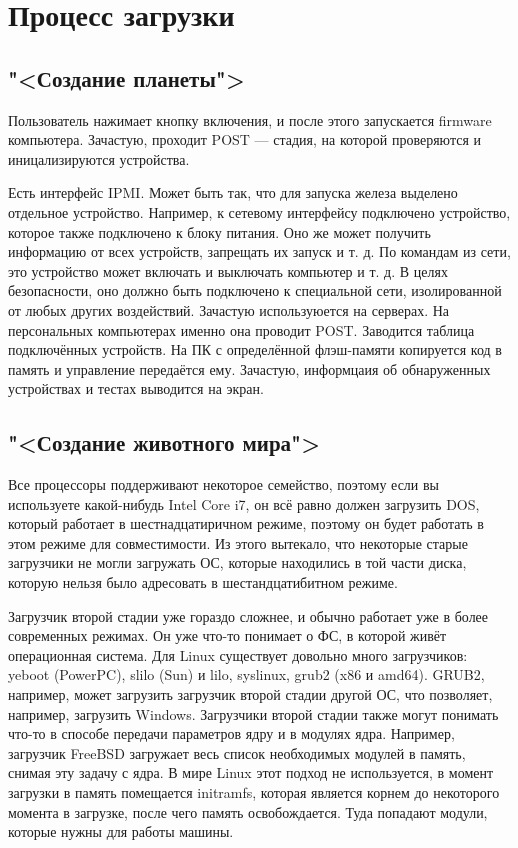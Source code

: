 \documentclass[main]{subfiles}
\begin{document}
\chapter{Процесс загрузки}

\section{"<Создание планеты">}
Пользователь нажимает кнопку включения, и после этого запускается
firmware компьютера. Зачастую, проходит POST --- стадия, на которой
проверяются и иницализируются устройства.

Есть интерфейс IPMI.
Может быть так, что для запуска железа выделено отдельное устройство.
Например, к сетевому интерфейсу подключено устройство, которое также
подключено к блоку питания. Оно же может получить информацию от всех
устройств, запрещать их запуск и т. д. По командам из сети, это устройство
может включать и выключать компьютер и т. д. В целях безопасности, оно должно
быть подключено к специальной сети, изолированной от любых других воздействий.
Зачастую используюется на серверах.
На персональных компьютерах именно она проводит POST. Заводится таблица
подключённых устройств. На ПК с определённой флэш-памяти копируется код в
память и управление передаётся ему. Зачастую, информцаия об обнаруженных
устройствах и тестах выводится на экран.

\section{"<Создание животного мира">}
Все процессоры поддерживают некоторое семейство, поэтому если вы используете
какой-нибудь Intel Core i7, он всё равно должен загрузить DOS, который работает
в шестнадцатиричном режиме, поэтому он будет работать в этом режиме для совместимости.
Из этого вытекало, что некоторые старые загрузчики не могли загружать ОС,
которые находились в той части диска, которую нельзя было адресовать в
шестандцатибитном режиме.

Загрузчик второй стадии уже гораздо сложнее, и обычно работает уже в более
современных режимах. Он уже что-то понимает о ФС, в которой живёт операционная
система. Для Linux существует довольно много загрузчиков: yeboot (PowerPC),
slilo (Sun) и lilo, syslinux, grub2 (x86 и amd64).
GRUB2, например, может загрузить загрузчик второй стадии другой ОС, что
позволяет, например, загрузить Windows.
Загрузчики второй стадии также могут понимать что-то в способе передачи параметров
ядру и в модулях ядра. Например, загрузчик FreeBSD загружает весь список необходимых
модулей в память, снимая эту задачу с ядра. В мире Linux этот подход не используется,
в момент загрузки в память помещается initramfs, которая является корнем до некоторого
момента в загрузке, после чего память освобождается. Туда попадают модули,
которые нужны для работы машины.
\end{document}
